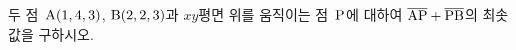 두 점~$\mathrm{A}(1{,}\mkern3mu\mathopen{}4{,}\mkern3mu\mathopen{}3)$, $\mathrm{B}(2{,}\mkern3mu\mathopen{}2{,}\mkern3mu\mathopen{}3)$과 $xy$평면 위를 움직이는 점~$\mathrm{P}$에 대하여 $\overline{\mathrm{AP}}+\overline{\mathrm{PB}}$의 최솟값을 구하시오.
